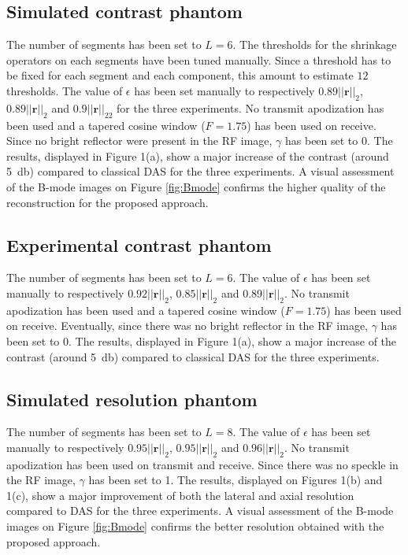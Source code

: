 \documentclass[conference]{IEEEtran}
\begin{document}
\subsection{Simulated contrast phantom}
\label{subsec_res_sim_contrast}
The number of segments has been set to $L = 6$. The thresholds for the shrinkage operators on each segments have been tuned manually. Since a threshold has to be fixed for each segment and each component, this amount to estimate $12$ thresholds. The value of $\epsilon$ has been set manually to respectively $0.89|| \bm{r} ||_2$, $0.89|| \bm{r} ||_2$ and $0.9|| \bm{r} ||_22$ for the three experiments. No transmit apodization has been used and a tapered cosine window ($F = 1.75$) has been used on receive. Since no bright reflector were present in the RF image, $\gamma$ has been set to 0.
The results, displayed in Figure 1(a), show a major increase of the contrast (around \SI{5}{\decibel}) compared to classical DAS for the three experiments. A visual assessment of the B-mode images on Figure \ref{fig:Bmode} confirms the higher quality of the reconstruction for the proposed approach.
\subsection{Experimental contrast phantom}
\label{subsec_res_exp_contrast}
The number of segments has been set to $L = 6$.  The value of $\epsilon$ has been set manually to respectively $0.92 || \bm{r} ||_2$, $0.85|| \bm{r} ||_2$ and $0.89|| \bm{r} ||_2$.  No transmit apodization has been used and a tapered cosine window ($F = 1.75$) has been used on receive. Eventually, since there was no bright reflector in the RF image, $\gamma$ has been set to 0.
The results, displayed in Figure 1(a), show a major increase of the contrast (around \SI{5}{\decibel}) compared to classical DAS for the three experiments.
\subsection{Simulated resolution phantom}
\label{subsec_res_sim_resolution}
The number of segments has been set to $L = 8$. The value of $\epsilon$ has been set manually to respectively $0.95 || \bm{r} ||_2$, $0.95 || \bm{r} ||_2$ and $0.96 || \bm{r} ||_2$.  No transmit apodization has been used on transmit and receive. Since there was no speckle in the RF image, $\gamma$ has been set to 1.
The results, displayed on Figures 1(b) and 1(c), show a major improvement of both the lateral and axial resolution compared to DAS for the three experiments. A visual assessment of the B-mode images on Figure \ref{fig:Bmode} confirms the better resolution obtained with the proposed approach.
\end{document}
